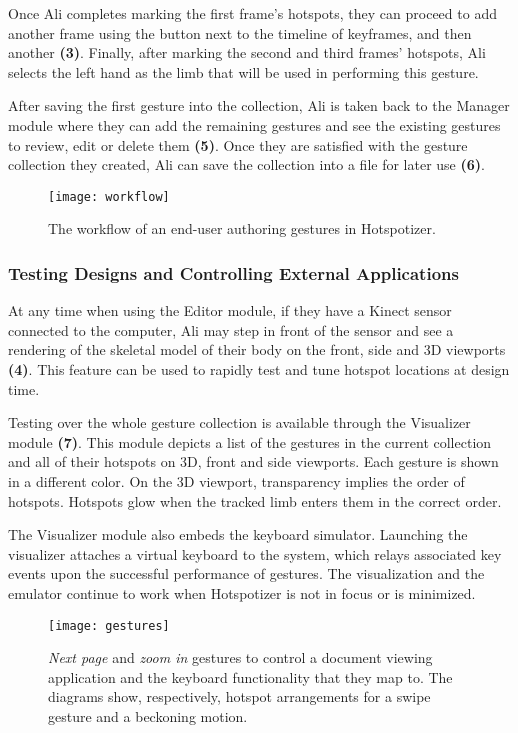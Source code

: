 Once Ali completes marking the first frame’s hotspots, they can proceed to add another frame using the button next to the timeline of keyframes, and then another \textbf{(3)}. Finally, after marking the second and third frames’ hotspots, Ali selects the left hand as the limb that will be used in performing this gesture.

After saving the first gesture into the collection, Ali is taken back to the Manager module where they can add the remaining gestures and see the existing gestures to review, edit or delete them \textbf{(5)}. Once they are satisfied with the gesture collection they created, Ali can save the collection into a file for later use \textbf{(6)}.

\begin{sidewaysfigure}
\centering
\texttt{[image: workflow]}
\caption{The workflow of an end-user authoring gestures in Hotspotizer.}
\label{fig:workflow}
\end{sidewaysfigure}

\subsubsection{Testing Designs and Controlling External Applications}

At any time when using the Editor module, if they have a Kinect sensor connected to the computer, Ali may step in front of the sensor and see a rendering of the skeletal model of their body on the front, side and 3D viewports \textbf{(4)}. This feature can be used to rapidly test and tune hotspot locations at design time.

Testing over the whole gesture collection is available through the Visualizer module \textbf{(7)}. This module depicts a list of the gestures in the current collection and all of their hotspots on 3D, front and side viewports. Each gesture is shown in a different color. On the 3D viewport, transparency implies the order of hotspots. Hotspots glow when the tracked limb enters them in the correct order.

The Visualizer module also embeds the keyboard simulator. Launching the visualizer attaches a virtual keyboard to the system, which relays associated key events upon the successful performance of gestures. The visualization and the emulator continue to work when Hotspotizer is not in focus or is minimized.

\begin{SCfigure}[\sidecaptionrelwidth][t]
\centering
\texttt{[image: gestures]}
\caption{\emph{Next page} and \emph{zoom in} gestures to control a document viewing application and the keyboard functionality that they map to. The diagrams show, respectively, hotspot arrangements for a swipe gesture and a beckoning motion.}
\label{fig:gestures}
\end{SCfigure}

